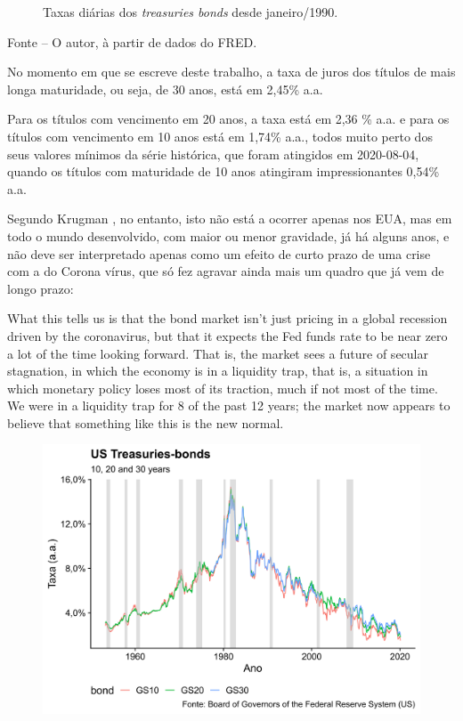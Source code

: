 \documentclass[
	12pt,				%
	oneside,			%
	a4paper,			%
	chapter=TITLE,		%
	section=TITLE,		%
	english,			%
	brazil				%
	]{abntex2}
\newcommand{\bcenter}{\begin{center}}
\newcommand{\ecenter}{\end{center}}
\begin{document}
\begin{refsection}
\begin{figure}[H]
\caption{Taxas diárias dos \emph{treasuries bonds} desde janeiro/1990.}\label{fig:yields2}
\end{figure}
\bcenter

\small Fonte -- O autor, à partir de dados do \gls{FRED}.
\ecenter

No momento em que se escreve deste trabalho, a taxa de juros dos títulos de mais
longa maturidade, ou seja, de 30 anos, está em 2,45\% a.a.

Para os títulos com vencimento em 20 anos, a taxa está em 2,36
\% a.a. e para os títulos com vencimento em 10 anos está em 1,74\% a.a.,
todos muito perto dos seus valores mínimos da série histórica, que foram
atingidos em 2020-08-04, quando os títulos
com maturidade de 10 anos atingiram impressionantes 0,54\% a.a.

Segundo Krugman \autocite*{krugman2020}, no entanto, isto não está a ocorrer apenas nos
\gls{EUA}, mas em todo o mundo desenvolvido, com maior ou menor gravidade, já há
alguns anos, e não deve ser interpretado apenas como um efeito de curto prazo
de uma crise com a do Corona vírus, que só fez agravar ainda mais um quadro
que já vem de longo prazo:
\begin{citacao}
What this tells us is that the bond market isn’t just pricing in a global
recession driven by the coronavirus, but that it expects the Fed funds rate to
be near zero a lot of the time looking forward. That is, the market sees a
future of secular stagnation, in which the economy is in a liquidity trap, that
is, a situation in which monetary policy loses most of its traction, much if not
most of the time. We were in a liquidity trap for 8 of the past 12 years; the
market now appears to believe that something like this is the new normal.
\end{citacao}
\begin{figure}[H]

{\centering \includegraphics[width=\textwidth]{images/fred-1} 

}
\end{figure}
\end{refsection}
\end{document}
